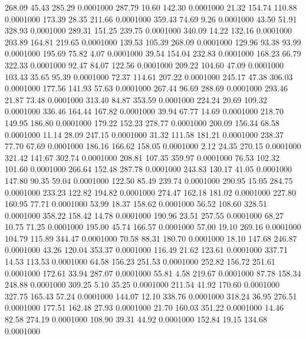  268.09   45.43  285.29   0.0001000
 287.79   10.60  142.30   0.0001000
  21.32  154.74  110.88   0.0001000
 173.39   28.35  211.66   0.0001000
 359.43   74.69    9.26   0.0001000
  43.50   51.91  328.93   0.0001000
 289.31  151.25  239.75   0.0001000
 340.09   14.22  132.16   0.0001000
 203.89  164.81  219.65   0.0001000
 139.53  105.39  268.09   0.0001000
 129.96   93.38   93.99   0.0001000
 195.69   75.82    4.07   0.0001000
  39.54  154.04  232.83   0.0001000
 168.23   66.79  322.33   0.0001000
  92.47   84.07  122.56   0.0001000
 209.22  104.60   47.09   0.0001000
 103.43   35.65   95.39   0.0001000
  72.37  114.61  207.22   0.0001000
 245.17   47.38  306.03   0.0001000
 177.56  141.93   57.63   0.0001000
 267.44   96.69  288.69   0.0001000
 293.46   21.87   73.48   0.0001000
 313.40   84.87  353.59   0.0001000
 224.24   20.69  109.32   0.0001000
 336.46  164.44  167.82   0.0001000
  39.94   67.77   14.69   0.0001000
 218.70  149.95  186.80   0.0001000
 179.22  152.23  278.77   0.0001000
 200.09  156.34   68.58   0.0001000
  11.14   28.09  247.15   0.0001000
  31.32  111.58  181.21   0.0001000
 238.37   77.70   67.69   0.0001000
 186.16  166.62  158.05   0.0001000
   2.12   24.35  270.15   0.0001000
 321.42  141.67  302.74   0.0001000
 208.81  107.35  359.97   0.0001000
  76.53  102.32  101.60   0.0001000
 266.64  152.48  287.78   0.0001000
 243.83  130.17   41.05   0.0001000
 147.80   90.35   59.04   0.0001000
 122.50   85.49  239.74   0.0001000
 290.95   15.05  284.75   0.0001000
 233.23  122.82  194.82   0.0001000
 274.47  162.18  181.02   0.0001000
 227.80  160.95   77.71   0.0001000
  53.99   18.37  158.62   0.0001000
  56.52  108.60  328.51   0.0001000
 358.22  158.42   14.78   0.0001000
 190.96   23.51  257.55   0.0001000
  68.27   10.75   71.25   0.0001000
 195.00   45.74  166.57   0.0001000
  57.00   19.10  269.16   0.0001000
 104.79  115.89  344.47   0.0001000
  70.58   88.31  180.70   0.0001000
  18.10  147.68  246.87   0.0001000
  43.26  120.04  353.37   0.0001000
 116.49   21.62  123.61   0.0001000
 337.71   14.53  113.53   0.0001000
  64.58  156.23  251.53   0.0001000
 252.82  156.72  251.61   0.0001000
 172.61   33.94  287.07   0.0001000
  55.81    4.58  219.67   0.0001000
  87.78  158.34  248.88   0.0001000
 309.25    5.10   35.25   0.0001000
 211.54   41.92  170.60   0.0001000
 327.75  165.43   57.24   0.0001000
 144.07   12.10  338.76   0.0001000
 318.24   36.95  276.51   0.0001000
 177.51  162.48   27.93   0.0001000
  21.70  160.03  351.22   0.0001000
  14.46   82.58  274.19   0.0001000
 108.90   39.31   44.92   0.0001000
 152.84   19.15  134.68   0.0001000
